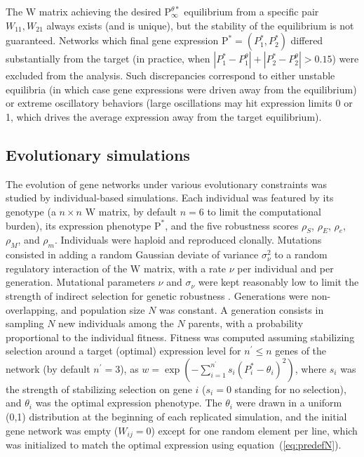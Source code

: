 \documentclass[10pt,a4paper]{article}
\newcommand{\stability}{{\rho_S}}
\newcommand{\earlyenv}{{\rho_E}}
\newcommand{\lateenv}{{\rho_e}}
\newcommand{\earlymut}{{\rho_M}}
\newcommand{\latemut}{{\rho_m}}
\newcommand{\W}{\bm{\mathrm W}}
\newcommand{\Pp}{\bm{\mathrm P}}
\begin{document}
The $\W$ matrix achieving the desired $\Pp^{\theta \ast}_\infty$ equilibrium from a specific pair $W_{11}, W_{21}$ always exists (and is unique), but the stability of the equilibrium is not guaranteed. Networks which final gene expression $\Pp^\ast = (P^\ast_1,P^\ast_2)$ differed substantially from the target (in practice, when $|P^\ast_1 - P^{\theta}_1| + |P^\ast_2 - P^{\theta}_2| > 0.15$) were excluded from the analysis. Such discrepancies correspond to either unstable equilibria (in which case gene expressions were driven away from the equilibrium) or extreme oscillatory behaviors (large oscillations may hit expression limits 0 or 1, which drives the average expression away from the target equilibrium). 

\subsection{Evolutionary simulations}

The evolution of gene networks under various evolutionary constraints was studied by individual-based simulations. Each individual was featured by its genotype (a $n \times n$ $\W$ matrix, by default $n=6$ to limit the computational burden), its expression phenotype $\Pp^*$, and the five robustness scores $\stability$, $\earlyenv$, $\lateenv$, $\earlymut$, and $\latemut$. Individuals were haploid and reproduced clonally. Mutations consisted in adding a random Gaussian deviate of variance $\sigma_\nu^2$ to a random regulatory interaction of the $\W$ matrix, with a rate $\nu$ per individual and per generation. Mutational parameters $\nu$ and $\sigma_\nu$ were kept reasonably low to limit the strength of indirect selection for genetic robustness \citep{WBB97,RL16}. Generations were non-overlapping, and population size $N$ was constant. A generation consists in sampling $N$ new individuals among the $N$ parents, with a probability proportional to the individual fitness. Fitness was computed assuming stabilizing selection around a target (optimal) expression level for $n^\prime \leq n$ genes of the network (by default $n^\prime=3$), as $w = \exp(- \sum_{i=1}^{n^\prime} s_i (P_i^* - \theta_i)^2 )$, where $s_i$ was the strength of stabilizing selection on gene $i$ ($s_i = 0$ standing for no selection), and $\theta_i$ was the optimal expression phenotype. The $\theta_i$ were drawn in a uniform (0,1) distribution at the beginning of each replicated simulation, and the initial gene network was empty ($W_{ij} = 0$) except for one random element per line, which was initialized to match the optimal expression using equation~(\ref{eq:predefN}). 
\end{document}
